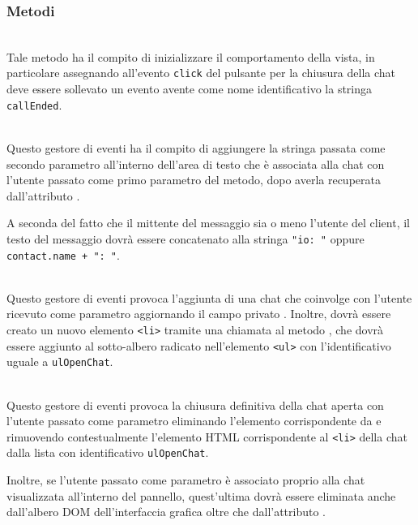 \subsubsection*{Metodi}
\begin{description}

  \item{}\\
  Tale metodo ha il compito di inizializzare il comportamento della vista, in particolare assegnando all'evento \verb'click' del pulsante per la chiusura della chat deve essere sollevato un evento avente come nome identificativo la stringa \verb'callEnded'.

  \item{}\\
  Questo gestore di eventi ha il compito di aggiungere la stringa passata come secondo parametro all'interno dell'area di testo che è associata alla chat con l'utente passato come primo parametro del metodo, dopo averla recuperata dall'attributo .

  A seconda del fatto che il mittente del messaggio sia o meno l'utente del client, il testo del messaggio dovrà essere concatenato alla stringa \verb'"io: "' oppure \verb'contact.name + ": "'.

  \item{}\\
  Questo gestore di eventi provoca l'aggiunta di una chat che coinvolge con l'utente ricevuto come parametro aggiornando il campo privato . Inoltre, dovrà essere creato un nuovo elemento \verb'<li>' tramite una chiamata al metodo , che dovrà essere aggiunto al sotto-albero radicato nell'elemento \verb'<ul>' con l'identificativo uguale a \verb'ulOpenChat'.

  \item{}\\
  Questo gestore di eventi provoca la chiusura definitiva della chat aperta con l'utente passato come parametro eliminando l'elemento corrispondente da  e rimuovendo contestualmente l'elemento HTML corrispondente al \verb'<li>' della chat dalla lista con identificativo \verb'ulOpenChat'.

  Inoltre, se l'utente passato come parametro è associato proprio alla chat visualizzata all'interno del pannello, quest'ultima dovrà essere eliminata anche dall'albero DOM dell'interfaccia grafica oltre che dall'attributo .


\end{description}
